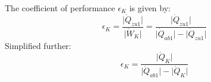 The coefficient of performance \( \epsilon_K \) is given by:  
\[
\epsilon_K = \frac{\lvert \dot{Q}_{zu1} \rvert}{\lvert \dot{W}_K \rvert} = \frac{\lvert \dot{Q}_{zu1} \rvert}{\lvert \dot{Q}_{ab1} \rvert - \lvert \dot{Q}_{zu1} \rvert}
\]  
Simplified further:  
\[
\epsilon_K = \frac{\lvert \dot{Q}_K \rvert}{\lvert \dot{Q}_{ab1} \rvert - \lvert \dot{Q}_K \rvert}
\]